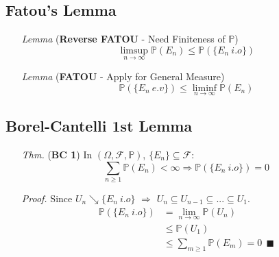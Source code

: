 \documentclass[a4paper,12pt,twoside]{book}
\begin{document}
\subsection{Fatou's Lemma}
\begin{itemize}
	\item[\textit{Lemma}] (\textbf{Reverse FATOU} - Need Finiteness of $\mathbb{P}$)
	\begin{equation}
		\limsup\limits_{n\rightarrow\infty}\mathbb{P}(E_n) \leq \mathbb{P}(\{E_n~i.o\})
	\end{equation}

	\item[\textit{Lemma}] (\textbf{FATOU} - Apply for General Measure)
	\begin{equation}
		\mathbb{P}(\{E_n~e.v\}) \leq \liminf\limits_{n\rightarrow\infty}\mathbb{P}(E_n)
	\end{equation}
\end{itemize}

\subsection{Borel-Cantelli 1st Lemma}
\begin{itemize}
	\item[\textit{Thm.}] (\textbf{BC 1}) In $(\Omega, \mathcal{F}, \mathbb{P})$, $\{E_n\}\subseteq \mathcal{F}$:
	\begin{equation}
		\sum_{n\geq 1}\mathbb{P}(E_n)<\infty \Rightarrow \mathbb{P}(\{E_n~i.o\})=0
	\end{equation}

	\item[\textit{Proof.}] Since $U_n\searrow \{E_n~i.o\}$ $\Rightarrow$ $U_{n}\subseteq U_{n-1}\subseteq ... \subseteq U_1$.
	\begin{equation}
	\begin{split}
		\mathbb{P}(\{E_n~i.o\})&=\lim\limits_{n\rightarrow\infty}\mathbb{P}(U_n)\\
		&\leq \mathbb{P}(U_1)\\
		&\leq \sum_{m\geq 1}\mathbb{P}(E_m)=0~~\blacksquare
	\end{split}
	\end{equation}
\end{itemize}


\end{document}
